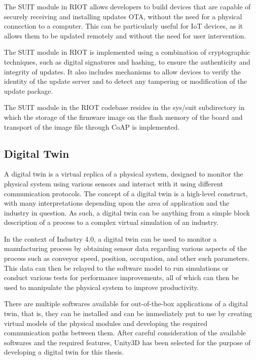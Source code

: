 The \acrshort{SUIT} module in RIOT allows developers to build devices that are capable of securely receiving and installing updates \acrfull{OTA}, without the need for a physical connection to a computer. This can be particularly useful for \acrshort{IoT} devices, as it allows them to be updated remotely and without the need for user intervention.

The \acrshort{SUIT} module in RIOT is implemented using a combination of cryptographic techniques, such as digital signatures and hashing, to ensure the authenticity and integrity of updates. It also includes mechanisms to allow devices to verify the identity of the update server and to detect any tampering or modification of the update package.

The \acrshort{SUIT} module in the RIOT codebase resides in the sys/suit subdirectory in which the storage of the firmware image on the flash memory of the board and transport of the image file through \acrshort{CoAP} is implemented.

\subsection{Digital Twin}
A digital twin is a virtual replica of a physical system, designed to monitor the physical system using various sensors and interact with it using different communication protocols. The concept of a digital twin is a high-level construct, with many interpretations depending upon the area of application and the industry in question. As such, a digital twin can be anything from a simple block description of a process to a complex virtual simulation of an industry.

In the context of Industry 4.0, a digital twin can be used to monitor a manufacturing process by obtaining sensor data regarding various aspects of the process such as conveyor speed, position, occupation, and other such parameters. This data can then be relayed to the software model to run simulations or conduct various tests for performance improvements, all of which can then be used to manipulate the physical system to improve productivity.

There are multiple softwares available for out-of-the-box applications of a digital twin, that is, they can be installed and can be immediately put to use by creating virtual models of the physical modules and developing the required communication paths between them. After careful consideration of the available softwares and the required features, Unity3D has been selected for the purpose of developing a digital twin for this thesis.

